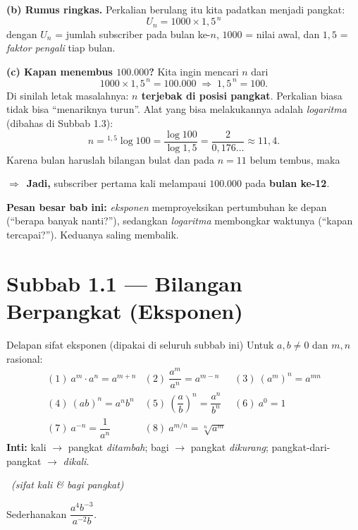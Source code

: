 \documentclass[11pt,a4paper]{report}
\theoremstyle{gaya}
\newcommand{\jadi}{\par\smallskip\noindent$\Rightarrow$\ \textbf{Jadi, }}
\newcommand{\soalno}[2]{%
  \par\bigskip
  \noindent{\large\bfseries\color{ungu}\rule[-2pt]{4pt}{14pt}\ Soal #1}%
  \ {\normalfont\itshape\color{gray}(#2)}\par\nopagebreak\smallskip}
\begin{document}
\textbf{(b) Rumus ringkas.} Perkalian berulang itu kita padatkan menjadi pangkat:
\[
\boxed{\,U_n = 1000 \times 1{,}5^{\,n}\,}
\]
dengan $U_n$ = jumlah subscriber pada bulan ke-$n$, $1000$ = nilai awal, dan
$1{,}5$ = \emph{faktor pengali} tiap bulan.

\textbf{(c) Kapan menembus $100.000$?} Kita ingin mencari $n$ dari
\[
1000\times 1{,}5^{\,n} = 100.000 \;\Longrightarrow\; 1{,}5^{\,n} = 100.
\]
Di sinilah letak masalahnya: \textbf{$n$ terjebak di posisi pangkat}. Perkalian
biasa tidak bisa ``menariknya turun''. Alat yang bisa melakukannya adalah
\emph{logaritma} (dibahas di Subbab 1.3):
\[
n = {}^{1{,}5}\!\log 100 = \frac{\log 100}{\log 1{,}5} = \frac{2}{0{,}176\ldots} \approx 11{,}4.
\]
Karena bulan haruslah bilangan bulat dan pada $n=11$ belum tembus, maka
\jadi subscriber pertama kali melampaui $100.000$ pada \textbf{bulan ke-12}.

\begin{tips}
\textbf{Pesan besar bab ini:} \emph{eksponen} memproyeksikan pertumbuhan ke depan
(``berapa banyak nanti?''), sedangkan \emph{logaritma} membongkar waktunya
(``kapan tercapai?''). Keduanya saling membalik.
\end{tips}

\section*{Subbab 1.1 — Bilangan Berpangkat (Eksponen)}

\begin{ingat}{Delapan sifat eksponen (dipakai di seluruh subbab ini)}
Untuk $a,b\neq 0$ dan $m,n$ rasional:
\[
\begin{array}{lll}
(1)\ a^m\cdot a^n=a^{m+n} & (2)\ \dfrac{a^m}{a^n}=a^{m-n} & (3)\ (a^m)^n=a^{mn}\\[8pt]
(4)\ (ab)^n=a^n b^n & (5)\ \left(\dfrac ab\right)^n=\dfrac{a^n}{b^n} & (6)\ a^0=1\\[8pt]
(7)\ a^{-n}=\dfrac{1}{a^n} & (8)\ a^{m/n}=\sqrt[n]{a^m} &
\end{array}
\]
\textbf{Inti:} kali $\to$ pangkat \emph{ditambah}; bagi $\to$ pangkat
\emph{dikurang}; pangkat-dari-pangkat $\to$ \emph{dikali}.
\end{ingat}

\soalno{1.1.1}{sifat kali \& bagi pangkat}
\begin{soalbox}{}
Sederhanakan $\dfrac{a^4 b^{-3}}{a^{-2} b}$.
\end{soalbox}
\end{document}
